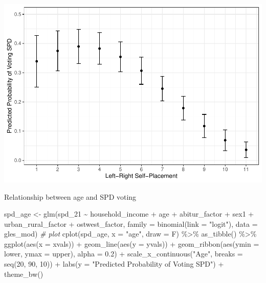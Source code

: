 \documentclass[
]{article}
\newenvironment{Shaded}{\begin{snugshade}}{\end{snugshade}}
\newcommand{\AttributeTok}[1]{\textcolor[rgb]{0.77,0.63,0.00}{#1}}
\newcommand{\CommentTok}[1]{\textcolor[rgb]{0.56,0.35,0.01}{\textit{#1}}}
\newcommand{\DecValTok}[1]{\textcolor[rgb]{0.00,0.00,0.81}{#1}}
\newcommand{\FloatTok}[1]{\textcolor[rgb]{0.00,0.00,0.81}{#1}}
\newcommand{\FunctionTok}[1]{\textcolor[rgb]{0.00,0.00,0.00}{#1}}
\newcommand{\NormalTok}[1]{#1}
\newcommand{\OtherTok}[1]{\textcolor[rgb]{0.56,0.35,0.01}{#1}}
\newcommand{\SpecialCharTok}[1]{\textcolor[rgb]{0.00,0.00,0.00}{#1}}
\newcommand{\StringTok}[1]{\textcolor[rgb]{0.31,0.60,0.02}{#1}}
\begin{document}
\includegraphics{AVCD_Final_Assignment-Edenhofer_files/figure-latex/spd-left-right-self-placement-1.pdf}

Relationship between age and SPD voting

\begin{Shaded}
\begin{Highlighting}[]
\NormalTok{spd\_age }\OtherTok{\textless{}{-}} \FunctionTok{glm}\NormalTok{(spd\_21 }\SpecialCharTok{\textasciitilde{}}\NormalTok{ household\_income }\SpecialCharTok{+}\NormalTok{ age }\SpecialCharTok{+}\NormalTok{ abitur\_factor }\SpecialCharTok{+}\NormalTok{ sex1 }\SpecialCharTok{+}\NormalTok{ urban\_rural\_factor }\SpecialCharTok{+}\NormalTok{ ostwest\_factor, }
               \AttributeTok{family =} \FunctionTok{binomial}\NormalTok{(}\AttributeTok{link =} \StringTok{"logit"}\NormalTok{), }
               \AttributeTok{data =}\NormalTok{ gles\_mod)}
\CommentTok{\# plot }
\FunctionTok{cplot}\NormalTok{(spd\_age, }\AttributeTok{x =} \StringTok{"age"}\NormalTok{, }\AttributeTok{draw =}\NormalTok{ F) }\SpecialCharTok{\%\textgreater{}\%}
  \FunctionTok{as\_tibble}\NormalTok{() }\SpecialCharTok{\%\textgreater{}\%}
  \FunctionTok{ggplot}\NormalTok{(}\FunctionTok{aes}\NormalTok{(}\AttributeTok{x =}\NormalTok{ xvals)) }\SpecialCharTok{+}
  \FunctionTok{geom\_line}\NormalTok{(}\FunctionTok{aes}\NormalTok{(}\AttributeTok{y =}\NormalTok{ yvals)) }\SpecialCharTok{+}
  \FunctionTok{geom\_ribbon}\NormalTok{(}\FunctionTok{aes}\NormalTok{(}\AttributeTok{ymin =}\NormalTok{ lower, }\AttributeTok{ymax =}\NormalTok{ upper), }\AttributeTok{alpha =} \FloatTok{0.2}\NormalTok{) }\SpecialCharTok{+}
  \FunctionTok{scale\_x\_continuous}\NormalTok{(}\StringTok{"Age"}\NormalTok{, }\AttributeTok{breaks =} \FunctionTok{seq}\NormalTok{(}\DecValTok{20}\NormalTok{, }\DecValTok{90}\NormalTok{, }\DecValTok{10}\NormalTok{)) }\SpecialCharTok{+}
  \FunctionTok{labs}\NormalTok{(}\AttributeTok{y =} \StringTok{"Predicted Probability of Voting SPD"}\NormalTok{) }\SpecialCharTok{+}
  \FunctionTok{theme\_bw}\NormalTok{()}
\end{Highlighting}
\end{Shaded}
\end{document}
